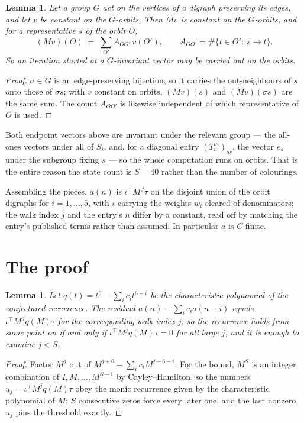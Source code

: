 \documentclass[11pt,a4paper]{article}
\theoremstyle{plain}
\newtheorem{lemma}[theorem]{Lemma}
\theoremstyle{definition}
\begin{document}
\begin{lemma}\label{lem:lump}
Let a group $G$ act on the vertices of a digraph preserving its edges, and let $v$ be constant
on the $G$-orbits. Then $Mv$ is constant on the $G$-orbits, and for a representative $s$ of
the orbit $O$,
\[
(Mv)(O)\;=\;\sum_{O'}A_{OO'}\,v(O'),\qquad
A_{OO'}=\#\{t\in O':\ s\to t\} .
\]
So an iteration started at a $G$-invariant vector may be carried out on the orbits.
\end{lemma}

\begin{proof}
$\sigma\in G$ is an edge-preserving bijection, so it carries the out-neighbours of $s$ onto
those of $\sigma s$; with $v$ constant on orbits, $(Mv)(s)$ and $(Mv)(\sigma s)$ are the same
sum. The count $A_{OO'}$ is likewise independent of which representative of $O$ is used.
\end{proof}

Both endpoint vectors above are invariant under the relevant group --- the all-ones vectors
under all of $S_i$, and, for a diagonal entry $(T_i^m)_{ss}$, the vector $e_s$ under the
subgroup fixing $s$ --- so the whole computation runs on orbits. That is the entire reason the
state count is $S=40$ rather than the number of colourings.

Assembling the pieces, $a(n)$ is $\iota^{\!\top}M^{\,j}\tau$ on the disjoint union of the
orbit digraphs for $i=1,\dots,5$, with $\iota$ carrying the weights $w_i$ cleared of
denominators; the walk index $j$ and the entry's $n$ differ by a constant, read off by
matching the entry's published terms rather than assumed. In particular $a$ is $C$-finite.

\section{The proof}

\begin{lemma}\label{lem:crit}
Let $q(t)=t^{6}-\sum_i c_it^{6-i}$ be the characteristic polynomial of the
conjectured recurrence. The residual $a(n)-\sum_ic_ia(n-i)$ equals
$\iota^{\!\top}M^{\,j}q(M)\tau$ for the corresponding walk index $j$, so the recurrence
holds from some point on if and only if $\iota^{\!\top}M^{j}q(M)\tau=0$ for all large $j$,
and it is enough to examine $j<S$.
\end{lemma}

\begin{proof}
Factor $M^{j}$ out of $M^{j+6}-\sum_ic_iM^{j+6-i}$. For the bound, $M^{S}$
is an integer combination of $I,M,\dots,M^{S-1}$ by Cayley--Hamilton, so the numbers
$u_j=\iota^{\!\top}M^{j}q(M)\tau$ obey the monic recurrence given by the characteristic
polynomial of $M$; $S$ consecutive zeros force every later one, and the last nonzero $u_j$
pins the threshold exactly.
\end{proof}
\end{document}
